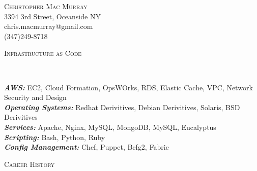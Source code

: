 \documentclass[9pt]{article}
\newenvironment{changemargin}[2]{%
  \begin{list}{}{%
    \setlength{\topsep}{0pt}%
    \setlength{\leftmargin}{#1}%
    \setlength{\rightmargin}{#2}%
    \setlength{\listparindent}{\parindent}%
    \setlength{\itemindent}{\parindent}%
    \setlength{\parsep}{\parskip}%
  }%
  \item[]}{\end{list}
}
\newcommand{\lineover}{
	\begin{changemargin}{-0.05in}{-0.05in}
		\vspace*{-8pt}
		\hrulefill \\
		\vspace*{-2pt}
	\end{changemargin}
}
\newcommand{\header}[1]{
	\begin{changemargin}{-0.5in}{-0.5in}
		\scshape{#1}\\
  	\lineover
	\end{changemargin}
}
\newcommand{\contact}[4]{
	\begin{changemargin}{-0.5in}{-0.5in}
		\begin{center}
			{\Large \scshape {#1}}\\ \smallskip
			{#2}\\ \smallskip
			{#3}\\ \smallskip
			{#4}\smallskip
		\end{center}
	\end{changemargin}
}
\newenvironment{body} {
	\vspace*{-16pt}
	\begin{changemargin}{-0.25in}{-0.5in}
  }
	{\end{changemargin}
}
\begin{document}
\contact{Christopher Mac Murray}{3394 3rd Street, Oceanside NY}{chris.macmurray@gmail.com}{(347)249-8718}

\header{Infrastructure as Code}

\begin{body}
	\vspace{14pt}
	\emph{\textbf{AWS:}}{} EC2, Cloud Formation, OpsWOrks, RDS, Elastic Cache, VPC, Network Security and Design\\
	\smallskip
	\emph{\textbf{Operating Systems:}}{} Redhat Derivitives, Debian Derivitives, Solaris, BSD Derivitives\\
	\smallskip
	\emph{\textbf{Services:}}{} Apache, Nginx, MySQL, MongoDB, MySQL, Eucalyptus\\
	\smallskip
	\emph{\textbf{Scripting:}}{} Bash, Python, Ruby\\
	\smallskip
	\emph{\textbf{Config Management:}}{} Chef, Puppet, Bcfg2, Fabric \\
\end{body}

\smallskip



\header{Career History}
\end{document}
